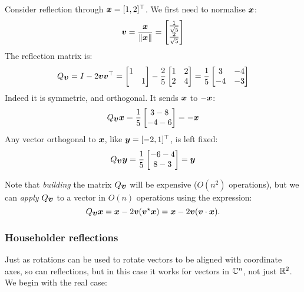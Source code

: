 \begin{example} Consider reflection through $\bm{{\mbox{\boldmath$x$\unboldmath}}} = [1,2]^\top$.  We first need to normalise $\bm{{\mbox{\boldmath$x$\unboldmath}}}$:
\[
\bm{{\mbox{\boldmath$v$\unboldmath}}} = {\bm{{\mbox{\boldmath$x$\unboldmath}}} \over \|\bm{{\mbox{\boldmath$x$\unboldmath}}}\|} = \begin{bmatrix} {1 \over \sqrt{5}} \\ {2 \over \sqrt{5}} \end{bmatrix}
\]
The reflection matrix is:
\[
Q_{\bm{{\mbox{\boldmath$v$\unboldmath}}}} = I - 2 \bm{{\mbox{\boldmath$v$\unboldmath}}} \bm{{\mbox{\boldmath$v$\unboldmath}}}^\top = \begin{bmatrix}1 \\ & 1 \end{bmatrix} - {2 \over 5} \begin{bmatrix} 1 & 2 \\ 2 & 4 \end{bmatrix}
 =  {1 \over 5} \begin{bmatrix} 3 & -4 \\ -4 & -3 \end{bmatrix}
\]
Indeed it is symmetric, and orthogonal. It sends $\bm{{\mbox{\boldmath$x$\unboldmath}}}$ to $-\bm{{\mbox{\boldmath$x$\unboldmath}}}$:
\[
Q_{\bm{{\mbox{\boldmath$v$\unboldmath}}}} \bm{{\mbox{\boldmath$x$\unboldmath}}} = {1 \over 5} \begin{bmatrix}3 - 8 \\ -4 - 6 \end{bmatrix} = -\bm{{\mbox{\boldmath$x$\unboldmath}}}
\]
Any vector orthogonal to $\bm{{\mbox{\boldmath$x$\unboldmath}}}$, like $\bm{{\mbox{\boldmath$y$\unboldmath}}} = [-2,1]^\top$, is left fixed:
\[
Q_{\bm{{\mbox{\boldmath$v$\unboldmath}}}} \bm{{\mbox{\boldmath$y$\unboldmath}}} = {1 \over 5} \begin{bmatrix}-6 -4 \\ 8 - 3 \end{bmatrix} = \bm{{\mbox{\boldmath$y$\unboldmath}}}
\]
\end{example}

Note that \emph{building} the matrix $Q_{\bm{{\mbox{\boldmath$v$\unboldmath}}}}$ will be expensive ($O(n^2)$ operations), but we can \emph{apply} $Q_{\bm{{\mbox{\boldmath$v$\unboldmath}}}}$ to a vector in $O(n)$ operations using the expression:
\[
Q_{\bm{{\mbox{\boldmath$v$\unboldmath}}}} \bm{{\mbox{\boldmath$x$\unboldmath}}} = \bm{{\mbox{\boldmath$x$\unboldmath}}} - 2 \bm{{\mbox{\boldmath$v$\unboldmath}}} (\bm{{\mbox{\boldmath$v$\unboldmath}}}^\star \bm{{\mbox{\boldmath$x$\unboldmath}}}) = \bm{{\mbox{\boldmath$x$\unboldmath}}} - 2 \bm{{\mbox{\boldmath$v$\unboldmath}}} (\bm{{\mbox{\boldmath$v$\unboldmath}}} \cdot \bm{{\mbox{\boldmath$x$\unboldmath}}}).
\]
\subsubsection{Householder reflections}
Just as rotations can be used to rotate vectors to be aligned with coordinate axes, so can reflections, but in this case it works for vectors in ${\mathbb C}^n$, not just ${\mathbb R}^2$. We begin with the real case:

